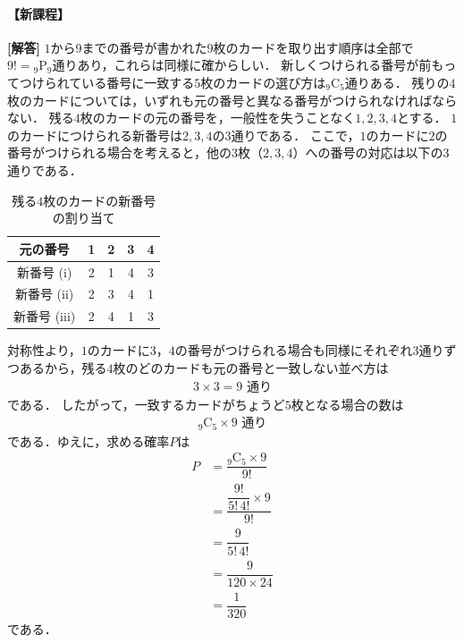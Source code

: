 \documentclass[../../main.tex]{subfiles}
\begin{document}
\begin{oframed}
  
\end{oframed}

\paragraph{【新課程】}
{\bf [解答]}
$1$から$9$までの番号が書かれた$9$枚のカードを取り出す順序は全部で$9! = {}_9\mathrm{P}_9$通りあり，これらは同様に確からしい．
新しくつけられる番号が前もってつけられている番号に一致する$5$枚のカードの選び方は${}_9\mathrm{C}_5$通りある．
残りの$4$枚のカードについては，いずれも元の番号と異なる番号がつけられなければならない．
残る$4$枚のカードの元の番号を，一般性を失うことなく$1, 2, 3, 4$とする．
$1$のカードにつけられる新番号は$2, 3, 4$の$3$通りである．
ここで，$1$のカードに$2$の番号がつけられる場合を考えると，他の$3$枚（$2, 3, 4$）への番号の対応は以下の$3$通りである．
\begin{table}[h]
  \centering
  \begin{tabular}{|c|c|c|c|c|}
    \hline
    元の番号 & 1 & 2 & 3 & 4 \\ \hline
    新番号 (i) & 2 & 1 & 4 & 3 \\ \hline
    新番号 (ii) & 2 & 3 & 4 & 1 \\ \hline
    新番号 (iii) & 2 & 4 & 1 & 3 \\ \hline
  \end{tabular}
  \caption{残る$4$枚のカードの新番号の割り当て}
\end{table}
対称性より，$1$のカードに$3$，$4$の番号がつけられる場合も同様にそれぞれ$3$通りずつあるから，残る$4$枚のどのカードも元の番号と一致しない並べ方は
\begin{align}
  3 \times 3 = 9 \text{ 通り}
\end{align}
である．
したがって，一致するカードがちょうど$5$枚となる場合の数は
\begin{align}
  {}_9\mathrm{C}_5 \times 9 \text{ 通り}
\end{align}
である．ゆえに，求める確率$P$は
\begin{align}
  P &= \dfrac{{}_9\mathrm{C}_5 \times 9}{9!} \nonumber\\
  &= \dfrac{\dfrac{9!}{5! \, 4!} \times 9}{9!} \nonumber\\
  &= \dfrac{9}{5! \, 4!} \nonumber\\
  &= \dfrac{9}{120 \times 24} \nonumber\\
  &= \dfrac{1}{320} \tag{答}
\end{align}
である．
\end{document}
